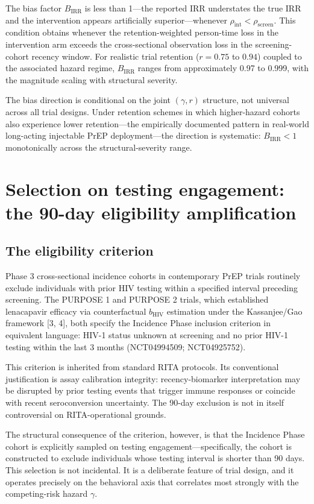 \documentclass[12pt]{article}
\begin{document}
The bias factor $B_{\mathrm{IRR}}$ is less than 1---the reported IRR understates the true IRR and the intervention appears artificially superior---whenever $\rho_{\mathrm{int}} < \rho_{\mathrm{screen}}$. This condition obtains whenever the retention-weighted person-time loss in the intervention arm exceeds the cross-sectional observation loss in the screening-cohort recency window. For realistic trial retention ($r = 0.75$ to $0.94$) coupled to the associated hazard regime, $B_{\mathrm{IRR}}$ ranges from approximately 0.97 to 0.999, with the magnitude scaling with structural severity.

The bias direction is conditional on the joint $(\gamma, r)$ structure, not universal across all trial designs. Under retention schemes in which higher-hazard cohorts also experience lower retention---the empirically documented pattern in real-world long-acting injectable PrEP deployment---the direction is systematic: $B_{\mathrm{IRR}} < 1$ monotonically across the structural-severity range.

\section{Selection on testing engagement: the 90-day eligibility amplification}

\subsection{The eligibility criterion}

Phase 3 cross-sectional incidence cohorts in contemporary PrEP trials routinely exclude individuals with prior HIV testing within a specified interval preceding screening. The PURPOSE 1 and PURPOSE 2 trials, which established lenacapavir efficacy via counterfactual $b_{\mathrm{HIV}}$ estimation under the Kassanjee/Gao framework [3, 4], both specify the Incidence Phase inclusion criterion in equivalent language: HIV-1 status unknown at screening and no prior HIV-1 testing within the last 3 months (NCT04994509; NCT04925752).

This criterion is inherited from standard RITA protocols. Its conventional justification is assay calibration integrity: recency-biomarker interpretation may be disrupted by prior testing events that trigger immune responses or coincide with recent seroconversion uncertainty. The 90-day exclusion is not in itself controversial on RITA-operational grounds.

The structural consequence of the criterion, however, is that the Incidence Phase cohort is explicitly sampled on testing engagement---specifically, the cohort is constructed to exclude individuals whose testing interval is shorter than 90 days. This selection is not incidental. It is a deliberate feature of trial design, and it operates precisely on the behavioral axis that correlates most strongly with the competing-risk hazard $\gamma$.
\end{document}
